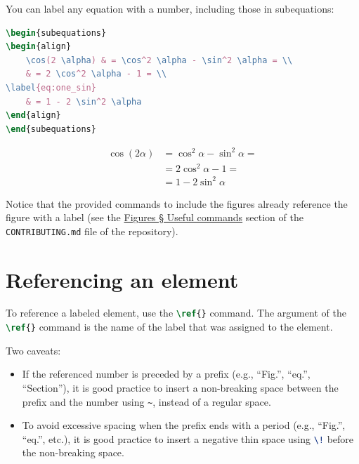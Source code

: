 You can label any equation with a number, including those in subequations:

\begin{lstlisting}[language=TeX]
\begin{subequations}
\begin{align}
    \cos(2 \alpha) & = \cos^2 \alpha - \sin^2 \alpha = \\
    & = 2 \cos^2 \alpha - 1 = \\
\label{eq:one_sin}
    & = 1 - 2 \sin^2 \alpha
\end{align}
\end{subequations}
\end{lstlisting}
\begin{subequations}
\begin{align}
    \cos(2 \alpha) & = \cos^2 \alpha - \sin^2 \alpha = \\
    & = 2 \cos^2 \alpha - 1 = \\
\label{eq:one_sin}
    & = 1 - 2 \sin^2 \alpha
\end{align}
\end{subequations}

Notice that the provided commands to include the figures already reference the figure with a label (see the \href{https://github.com/MuNuChapterHKN/Eta-Kappa-Notes/blob/structure/CONTRIBUTING.md#useful-commands}{Figures § Useful commands} section of the \texttt{CONTRIBUTING.md} file of the repository).

\section{Referencing an element}
\label{sec:referencing}

To reference a labeled element, use the \lstinline[language=TeX]|\ref{}| command. The argument of the \lstinline[language=TeX]|\ref{}| command is the name of the label that was assigned to the element.

Two caveats:
\begin{itemize}
    \item If the referenced number is preceded by a prefix (e.g., ``Fig.'', ``eq.'', ``Section''), it is good practice to insert a non-breaking space between the prefix and the number using \lstinline[language=TeX]|~|, instead of a regular space.
    \item To avoid excessive spacing when the prefix ends with a period (e.g., ``Fig.'', ``eq.'', etc.), it is good practice to insert a negative thin space using \lstinline[language=TeX]|\!| before the non-breaking space.
\end{itemize}

